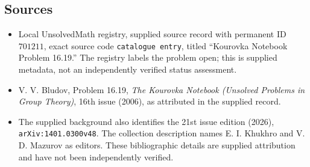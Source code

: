 \documentclass[11pt]{article}
\begin{document}
\subsection{Sources}
\begin{itemize}
\item Local UnsolvedMath registry, supplied source record with permanent ID \(701211\), exact source code \texttt{catalogue entry}, titled ``Kourovka Notebook Problem 16.19.'' The registry labels the problem open; this is supplied metadata, not an independently verified status assessment.
\item V. V. Bludov, Problem 16.19, \emph{The Kourovka Notebook (Unsolved Problems in Group Theory)}, 16th issue (2006), as attributed in the supplied record.
\item The supplied background also identifies the 21st issue edition (2026), \texttt{arXiv:1401.0300v48}. The collection description names E. I. Khukhro and V. D. Mazurov as editors. These bibliographic details are supplied attribution and have not been independently verified.
\end{itemize}
\end{document}
